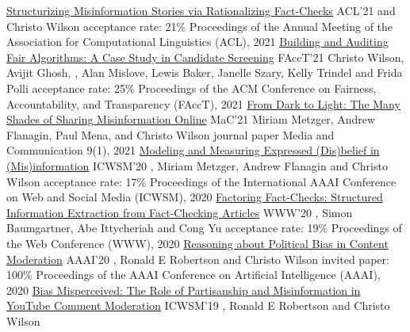 \documentclass[letterpaper]{awesome-cv}
\begin{document}
\addvspace{1.5ex}
\addvspace{1ex}

\begin{cventries}
  \cvpub
    {\href{https://shanjiang.me/publications/acl21_paper.pdf}{Structurizing Misinformation Stories via Rationalizing Fact-Checks}}
    {ACL'21}
    { and Christo Wilson}
    {acceptance rate: 21\%}
    { Proceedings of the Annual Meeting of the Association for Computational Linguistics (ACL), 2021}
  \cvpubspecialtwo
    {\href{https://shanjiang.me/publications/facct21_paper.pdf}{Building and Auditing Fair Algorithms: A Case Study in Candidate Screening}}
    {FAccT'21}
    {Christo Wilson, Avijit Ghosh, , Alan Mislove, Lewis Baker, Janelle Szary, Kelly Trindel and Frida Polli}
    {acceptance rate: 25\%}
    { Proceedings of the ACM Conference on Fairness, Accountability, and Transparency (FAccT), 2021}
  \cvpub
    {\href{https://shanjiang.me/publications/mac21_paper.pdf}{From Dark to Light: The Many Shades of Sharing Misinformation Online}}
    {MaC'21}
    {Miriam Metzger, Andrew Flanagin, Paul Mena,  and Christo Wilson}
    {journal paper}
    {Media and Communication 9(1), 2021}
  \cvpub
    {\href{https://shanjiang.me/publications/icwsm20_paper.pdf}{Modeling and Measuring Expressed (Dis)belief in (Mis)information}}
    {ICWSM'20}
    {, Miriam Metzger, Andrew Flanagin and Christo Wilson}
    {acceptance rate: 17\%}
    { Proceedings of the International AAAI Conference on Web and Social Media (ICWSM), 2020}
  \cvpub
    {\href{https://shanjiang.me/publications/www20_paper.pdf}{Factoring Fact-Checks: Structured Information Extraction from Fact-Checking Articles}}
    {WWW'20}
    {, Simon Baumgartner, Abe Ittycheriah and Cong Yu}
    {acceptance rate: 19\%}
    { Proceedings of the Web Conference (WWW), 2020}
  \cvpub
    {\href{https://shanjiang.me/publications/aaai20_paper.pdf}{Reasoning about Political Bias in Content Moderation}}
    {AAAI'20}
    {, Ronald E Robertson and Christo Wilson}
    {invited paper: 100\%}
    { Proceedings of the AAAI Conference on Artificial Intelligence (AAAI), 2020}
  \cvpubspecial
    {\href{https://shanjiang.me/publications/icwsm19_paper.pdf}{Bias Misperceived: The Role of Partisanship and Misinformation in YouTube Comment Moderation}}
    {ICWSM'19}
    {, Ronald E Robertson and Christo Wilson}

\end{cventries}
\end{document}

